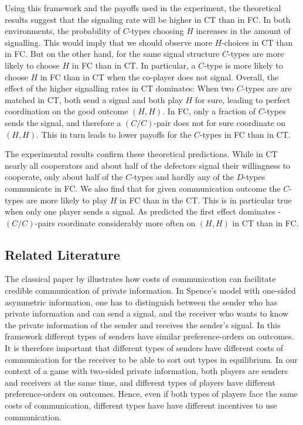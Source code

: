 \documentclass[12pt]{article}
\theoremstyle{break}
\begin{document}
Using this framework and the payoffs used in the experiment, the theoretical results suggest that the signaling rate will be higher in CT than in FC. In both environments, the probability of $C$-types choosing $H$ increases in the amount of signalling. This would imply that we should observe more $H$-choices in CT than in FC. But on the other hand, for the same signal structure $C$-types are more likely to choose $H$ in FC than in CT. In particular, a $C$-type is more likely to choose $H$ in FC than in CT when the co-player does not signal. Overall, the effect of the higher signalling rates in CT dominates: When two $C$-types are are matched in CT, both send a signal and both play $H$ for sure, leading to perfect coordination on the good outcome $(H,H)$. In FC, only a fraction of $C$-types sends the signal, and therefore a $(C/C)$-pair does not for sure coordinate on $(H,H)$. This in turn leads to lower payoffs for the $C$-types in FC than in CT. 

The experimental results confirm these theoretical predictions. While in CT nearly all cooperators and about half of the defectors signal their willingness to cooperate, only about half of the $C$-types and hardly any of the $D$-types communicate in FC. We also find that for given communication outcome the $C$-types are more likely to play $H$ in FC than in the CT. This is in particular true when only one player sends a signal. As predicted the first effect dominates - $(C/C)$-pairs coordinate considerably more often on $(H,H)$ in CT than in FC.

 \subsection*{Related Literature}
The classical paper by \cite{Spence1973} illustrates how costs of communication can facilitate credible communication of private information. In Spence's model with one-sided asymmetric information, one has to distinguish between the sender who has private information and can send a signal, and the receiver who wants to know the private information of the sender and receives the sender's signal. In this framework different types of senders have similar preference-orders on outcomes. It is therefore important that different types of senders have different costs of communication for the receiver to be able to sort out types in equilibrium. In our context of a game with two-sided private information, both players are senders and receivers at the same time, and different types of players have different preference-orders on outcomes. Hence, even if both types of players face the same costs of communication, different types have have different incentives to use communication.
\end{document}
